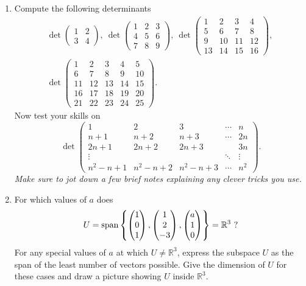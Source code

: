 \begin{enumerate}
\item
Compute the following determinants
\begin{gather*}
\det\begin{pmatrix}1&2\\3&4
\end{pmatrix},\:
\det\begin{pmatrix}1&2&3\\4&5&6\\7&8&9
\end{pmatrix},\:
\det\begin{pmatrix}1&2&3&4\\5&6&7&8\\9&10&11&12\\13&14&15&16
\end{pmatrix} ,\:\\
\det\begin{pmatrix}1&2&3&4&5\\6&7&8&9&10\\11&12&13&14&15\\
16&17&18&19&20\\21&22&23&24&25
\end{pmatrix}.
\end{gather*}
Now test your skills on
\[
\det\left(\begin{array}{ccccc}1&2&3&\cdots&n\\n+1&n+2&n+3&\cdots&2n\\2n+1&2n+2&2n+3&&3n \\
\vdots&&&\ddots&\vdots\\n^2-n+1&n^2-n+2&n^2-n+3&\cdots&n^2
\end{array}\right).
\]
{\itshape Make sure to jot down a few brief notes explaining any clever tricks you use.}

\item
For which values of $a$ does \[U=\operatorname{span}\left\{
\begin{pmatrix}1\\0\\1\end{pmatrix},\begin{pmatrix}1\\2\\-3\end{pmatrix},\begin{pmatrix}a\\1\\0\end{pmatrix}\right\}={\mathbb R}^3\ ?\]
 For any special values of $a$ at which $U\neq{\mathbb R}^3$, express the subspace $U$ as the span of the least number of vectors possible. Give the dimension of $U$ for these cases and
 draw a picture showing $U$ inside ${\mathbb R}^3$.


\end{enumerate}

